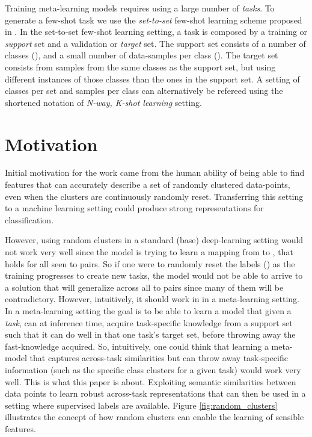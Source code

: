 \documentclass{article}
\begin{document}
Training meta-learning models requires using a large number of \emph{tasks}. To generate a few-shot task we use the \emph{set-to-set} few-shot learning scheme proposed in \citep{vinyals2016matching}. In the set-to-set few-shot learning setting, a task is composed by a training or \emph{support} set and a validation or \emph{target} set. The support set consists of a number of classes (), and a small number of data-samples per class (). The target set consists from samples from the same classes as the support set, but using different instances of those classes than the ones in the support set. A setting of  classes per set and  samples per class can alternatively be refereed using the shortened notation of \emph{N-way, K-shot learning} setting.

\section{Motivation}
Initial motivation for the work came from the human ability of being able to find features that can accurately describe a set of randomly clustered data-points, even when the clusters are continuously randomly reset. Transferring this setting to a machine learning setting could produce strong representations for classification.

However, using random clusters in a standard (base) deep-learning setting would not work very well since the model is trying to learn a mapping from  to , that holds for all seen  to  pairs. So if one were to randomly reset the labels () as the training progresses to create new tasks, the model would not be able to arrive to a solution that will generalize across all  to  pairs since many of them will be contradictory. However, intuitively, it should work in in a meta-learning setting. In a meta-learning setting the goal is to be able to learn a model that given a \emph{task}, can at inference time, acquire task-specific knowledge from a support set such that it can do well in that one task's target set, before throwing away the fast-knowledge acquired. So, intuitively, one could think that learning a meta-model that captures across-task similarities but can throw away task-specific information (such as the specific class clusters for a given task) would work very well. This is what this paper is about. Exploiting semantic similarities between data points to learn robust across-task representations that can then be used in a setting where supervised labels are available. Figure \ref{fig:random_clusters} illustrates the concept of how random clusters can enable the learning of sensible features.
\end{document}
